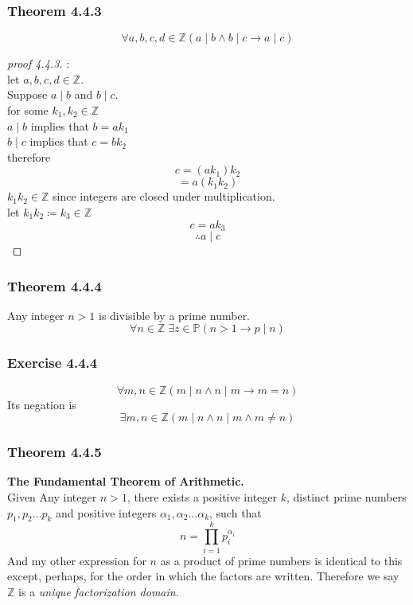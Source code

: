 \documentclass[12pt]{book}
\newcommand{\Z}{\mathbb{Z}}
\newcommand{\paren}[1]{\left( #1 \right)}
\begin{document}
\subsubsection{Theorem 4.4.3}
\[
\forall a,b,c,d \in \Z \paren{
a \mid b \wedge b \mid c \rightarrow a \mid c
}
\]
\begin{proof}[proof 4.4.3]:\\

    let $a,b,c,d \in \Z$.\\
    Suppose $a\mid b$ and $b \mid c$.\\
    for some $k_1,k_2 \in \Z$\\
    $a \mid b$ implies that $b = ak_1$\\
    $b \mid c$ implies that $c = bk_2$\\
    therefore
    \[
    c = \paren{ak_1}k_2
    \]
    \[
    = a\paren{k_1k_2}
    \]
    $k_1k_2 \in \Z$ since integers are closed under multiplication.\\
    let $k_1k_2 \coloneqq k_3 \in \Z$\\
    \[
    c = ak_3
    \]
    \[
    \therefore a \mid c
    \]
    
    
\end{proof}

\subsubsection{Theorem 4.4.4}
Any integer $n>1$ is divisible by a prime number. 
\[
\forall n \in \Z \; \exists z \in \mathbb{P} \paren{
n>1 \rightarrow p \mid n
}
\]

\subsubsection{Exercise 4.4.4}
\[
\forall m,n \in \Z \paren{
m \mid n \wedge n \mid m \rightarrow m=n
}
\]
Its negation is
\[
\exists m,n\in \Z \paren{
m \mid n \wedge n \mid m \wedge m \neq n
}
\]

\subsubsection{Theorem 4.4.5}
\textbf{The Fundamental Theorem of Arithmetic.}\\
Given Any integer $n>1$, there exists a positive integer $k$, distinct prime numbers $p_1,p_2\ldots p_k$ and positive integers $\alpha _1, \alpha_2\ldots \alpha_k$, such that
\[
n = \prod_{i=1}^{k} p_i^{\alpha_i}
\]
And my other expression for $n$ as a product of prime numbers is identical to this except, perhaps, for the order in which the factors are written. Therefore we say $\Z$ is a \textit{unique factorization domain}.
\end{document}
